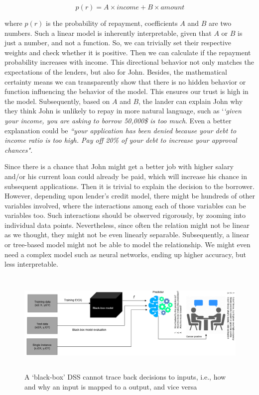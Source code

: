 \vspace{-4mm}
\begin{equation}
    p(r) = A \times income + B \times amount
\end{equation}
\vspace{-4mm}

\hspace*{3.5mm} where $p(r)$ is the probability of repayment, coefficients $A$ and $B$ are two numbers. Such a linear model is inherently interpretable, given that $A$ or $B$ is just a number, and not a function. So, we can trivially set their respective weights and check whether it is positive. Then we can calculate if the repayment probability increases with income. This directional behavior not only matches the expectations of the lenders, but also for John. Besides, the mathematical certainty means we can transparently show that there is no hidden behavior or function influencing the behavior of the model. This ensures our trust is high in the model. Subsequently, based on $A$ and $B$, the lander can explain John why they think John is unlikely to repay in more natural language, such as `\textit{`given your income, you are asking to borrow 50,000\$ is too much}. Even a better explanation could be \textit{``your application has been denied because your debt to income ratio is too high. Pay off 20\% of your debt to increase your approval chances"}. 

\hspace*{3.5mm} Since there is a chance that John might get a better job with higher salary and/or his current loan could already be paid, which will increase his chance in subsequent applications. Then it is trivial to explain the decision to the borrower. However, depending upon lender's credit model, there might be hundreds of other variables involved, where the interactions among each of those variables can be variables too. Such interactions should be observed rigorously, by zooming into individual data points. Nevertheless, since often the relation might not be linear as we thought, they might not be even linearly separable. Subsequently, a linear or tree-based model might not be able to model the relationship. We might even need a complex model such as neural networks, ending up higher accuracy, but less interpretable.  

\begin{figure}
	\centering
	\includegraphics[width=0.9\linewidth,height=50mm]{images/bbm.png}
	\caption{A `black-box' DSS cannot trace back decisions to inputs, i.e., how and why an input is mapped to a output, and vice versa}
    \label{fig:model_bbm}
    \vspace{-2mm}
\end{figure}

